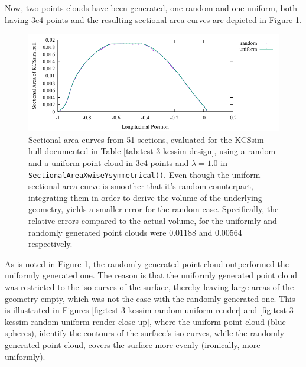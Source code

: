 \documentclass{report}
\begin{document}
\newpar Now, two points clouds have been generated, one random and one uniform, both having 3e4 points and 
the resulting sectional area curves are depicted in Figure \ref{fig:test-3-sac-random-uniform}. 
\begin{figure}[H]
    \centering
    \includegraphics[width=0.7\linewidth]{figures/test-3-sac-random-uniform.pdf}
    \caption{Sectional area curves from 51 sections, evaluated for the KCSsim hull documented 
    in Table \ref{tab:test-3-kcssim-design}, using a random and a uniform point cloud in 3e4
    points and $\lambda = 1.0$ in \texttt{SectionalAreaXwiseYsymmetrical()}. Even though the uniform
    sectional area curve is smoother that it's random counterpart, integrating them in order to 
    derive the volume of the underlying geometry, yields a smaller error for the random-case. Specifically,
    the relative errors compared to the actual volume, for the uniformly and randomly generated 
    point clouds were 0.01188 and 0.00564 respectively.}
    \label{fig:test-3-sac-random-uniform}
\end{figure}
\newpar As is noted in Figure \ref{fig:test-3-sac-random-uniform}, the randomly-generated point 
cloud outperformed the uniformly generated one. The reason is that the uniformly generated point cloud was restricted to the iso-curves of the surface, thereby
leaving large areas of the geometry empty, which was not the case with the randomly-generated one.
This is illustrated in Figures \ref{fig:test-3-kcssim-random-uniform-render} and 
\ref{fig:test-3-kcssim-random-uniform-render-close-up}, where the uniform point cloud (blue spheres),
identify the contours of the surface's iso-curves, while the randomly-generated point cloud, covers the surface 
more evenly (ironically, more uniformly).
\end{document}
